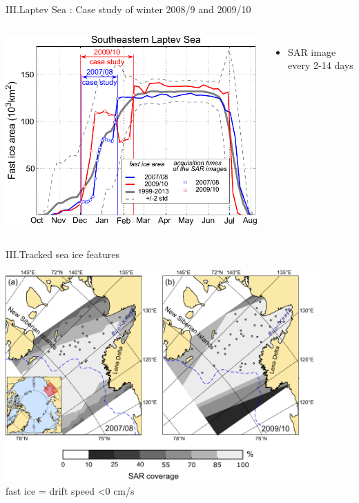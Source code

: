 \documentclass[8pt]{beamer}
\begin{document}
\setwatermark{\fontsize{125pt}{125pt}\selectfont{}}
\begin{frame}[fragile]{III.Laptev Sea : Case study of winter 2008/9 and 2009/10}
\begin{columns}
	\includegraphics[width=1\textwidth]{./img/casestudy.pdf}
	\begin{itemize}
		\item SAR image every 2-14 days
	\end{itemize}
\end{columns}
\end{frame}

\setwatermark{\fontsize{125pt}{125pt}\selectfont{}}
\begin{frame}[fragile]{III.Tracked sea ice features}

		\begin{center}
		\includegraphics[width=0.9\textwidth]{./img/trackpoints.pdf}\\
		fast ice =  drift speed \textless 0 cm/s
		\end{center}

\end{frame}
\end{document}
